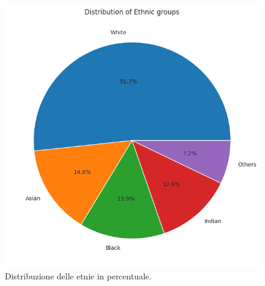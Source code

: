 \documentclass[a4paper,12pt]{report}
\begin{document}
	\begin{figure}[H]
		\centering
		\includegraphics[width=1.0\textwidth]{img/pie_ethnic_image.png}
		\caption{Distribuzione delle etnie in percentuale.}
	\end{figure}
	
\end{document}
